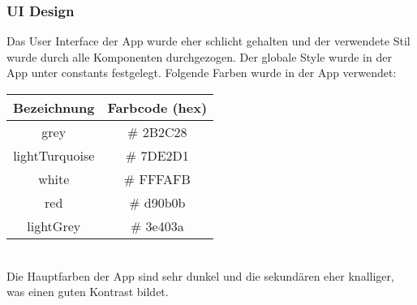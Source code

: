 \documentclass[]{article}
\begin{document}
\subsubsection{UI Design}
Das User Interface der App wurde eher schlicht gehalten und der verwendete Stil wurde durch alle Komponenten durchgezogen. Der globale Style wurde in der App unter constants festgelegt. Folgende Farben wurde in der App verwendet: \\
\begin{tabularx}{\textwidth}{ |c|c| }
\hline
\textbf{Bezeichnung} & \textbf{Farbcode (hex)} \\
\hline
grey & \# 2B2C28 \\
\hline 
lightTurquoise & \# 7DE2D1 \\
\hline 
white & \# FFFAFB \\
\hline 
red & \# d90b0b \\
\hline 
lightGrey & \# 3e403a \\
\hline 
\end{tabularx} \newline \\
Die Hauptfarben der App sind sehr dunkel und die sekundären eher knalliger, was einen guten Kontrast bildet.
\end{document}
